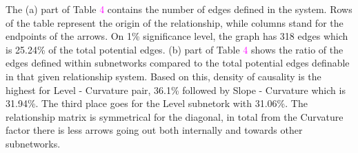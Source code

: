 \documentclass[12pt,bibliography=totoc]{article}
\begin{document}

\bigskip


The (a) part of Table \textcolor{magenta}{4} contains the number of edges defined in the system. Rows of the table represent the origin of the relationship, while columns stand for the endpoints of the arrows. On 1\% significance level, the graph has 318 edges which is 25.24\% of the total potential edges. (b) part of Table \textcolor{magenta}{4} shows the ratio of the edges defined within subnetworks compared to the total potential edges definable in that given relationship system. Based on this, density of causality is the highest for Level - Curvature pair, 36.1\% followed by Slope - Curvature which is 31.94\%. The third place goes for the Level subnetork with 31.06\%. The relationship matrix is symmetrical for the diagonal, in total from the Curvature factor there is less arrows going out both internally and towards other subnetworks.

\end{document}
